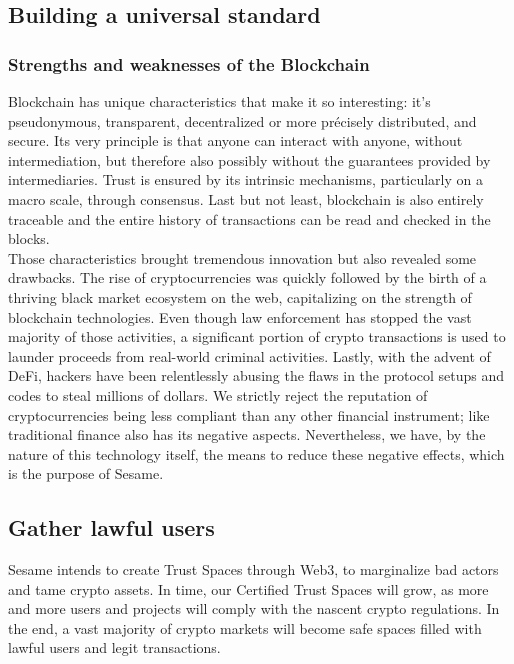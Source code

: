 ﻿\documentclass[a4paper]{article}
\let\OldTexttrademark\texttrademark
\renewcommand{\texttrademark}{\OldTexttrademark\xspace}%
\begin{document}
\subsection{Building a universal standard} 
\subsubsection{Strengths and weaknesses of the Blockchain}
Blockchain has unique characteristics that make it so interesting: it’s pseudonymous, transparent, decentralized or more précisely distributed, and secure. Its very principle is that anyone can interact with anyone, without intermediation, but therefore also possibly without the guarantees provided by intermediaries. Trust is ensured by its intrinsic mechanisms, particularly on a macro scale, through consensus. Last but not least, blockchain is also entirely traceable and the entire history of transactions can be read and checked in the blocks. \\

Those characteristics brought tremendous innovation but also revealed some drawbacks.  The rise of cryptocurrencies was quickly followed by the birth of a thriving black market ecosystem on the web, capitalizing on the strength of blockchain technologies. Even though law enforcement has stopped the vast majority of those activities, a significant portion of crypto transactions is used to launder proceeds from real-world criminal activities. Lastly, with the advent of DeFi, hackers have been relentlessly abusing the flaws in the protocol setups and codes to steal millions of dollars. We strictly reject the reputation of cryptocurrencies being less compliant than any other financial instrument; like traditional finance also has its negative aspects. Nevertheless, we have, by the nature of this technology itself, the means to reduce these negative effects, which is the purpose of Sesame.

\subsection{Gather lawful users}
Sesame intends to create Trust Spaces through Web3, to marginalize bad actors and tame crypto assets. In time, our Certified Trust Spaces\texttrademark will grow, as more and more users and projects will comply with the nascent crypto regulations. In the end, a vast majority of crypto markets will become safe spaces filled with lawful users and legit transactions.  \\
\end{document}
